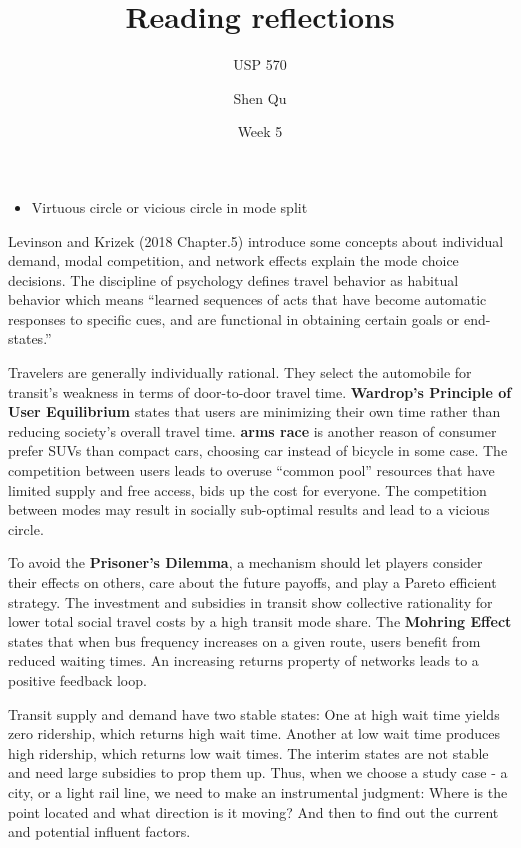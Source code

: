 \documentclass[12pt,]{article}
\title{Reading reflections}
\subtitle{USP 570}
\author{Shen Qu}
\date{Week 5}
\providecommand{\tightlist}{%
  \setlength{\itemsep}{0pt}\setlength{\parskip}{0pt}}
\begin{document}
\maketitle

\begin{itemize}
\tightlist
\item
  Virtuous circle or vicious circle in mode split
\end{itemize}

Levinson and Krizek (2018 Chapter.5) introduce some concepts about
individual demand, modal competition, and network effects explain the
mode choice decisions. The discipline of psychology defines travel
behavior as habitual behavior which means ``learned sequences of acts
that have become automatic responses to specific cues, and are
functional in obtaining certain goals or end-states.''

Travelers are generally individually rational. They select the
automobile for transit's weakness in terms of door-to-door travel time.
\textbf{Wardrop's Principle of User Equilibrium} states that users are
minimizing their own time rather than reducing society's overall travel
time. \textbf{arms race} is another reason of consumer prefer SUVs than
compact cars, choosing car instead of bicycle in some case. The
competition between users leads to overuse ``common pool'' resources
that have limited supply and free access, bids up the cost for everyone.
The competition between modes may result in socially sub-optimal results
and lead to a vicious circle.

To avoid the \textbf{Prisoner's Dilemma}, a mechanism should let players
consider their effects on others, care about the future payoffs, and
play a Pareto efficient strategy. The investment and subsidies in
transit show collective rationality for lower total social travel costs
by a high transit mode share. The \textbf{Mohring Effect} states that
when bus frequency increases on a given route, users benefit from
reduced waiting times. An increasing returns property of networks leads
to a positive feedback loop.

Transit supply and demand have two stable states: One at high wait time
yields zero ridership, which returns high wait time. Another at low wait
time produces high ridership, which returns low wait times. The interim
states are not stable and need large subsidies to prop them up. Thus,
when we choose a study case - a city, or a light rail line, we need to
make an instrumental judgment: Where is the point located and what
direction is it moving? And then to find out the current and potential
influent factors.
\end{document}
